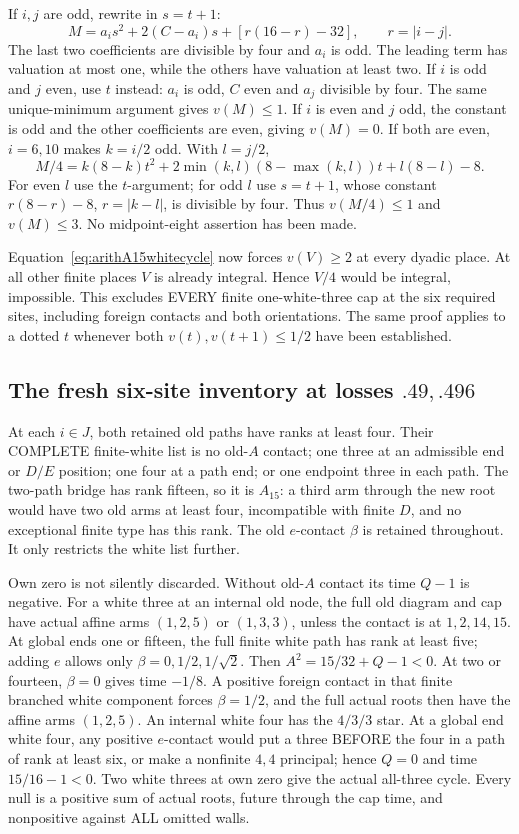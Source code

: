 \documentclass[11pt]{article}
\begin{document}
If \(i,j\) are odd, rewrite in \(s=t+1\):
\[
 M=a_is^2+2(C-a_i)s+[r(16-r)-32],\qquad r=|i-j|.
\]
The last two coefficients are divisible by four and \(a_i\)
is odd.  The leading term has valuation at most one, while
the others have valuation at least two.
If \(i\) is odd and \(j\) even, use \(t\) instead:
\(a_i\) is odd, \(C\) even and \(a_j\) divisible by four.
The same unique-minimum argument gives \(v(M)\le1\).
If \(i\) is even and \(j\) odd, the constant is odd and the
other coefficients are even, giving \(v(M)=0\).
If both are even, \(i=6,10\) makes \(k=i/2\) odd.
With \(l=j/2\),
\[
 M/4=k(8-k)t^2+2\min(k,l)(8-\max(k,l))t+l(8-l)-8 .
\]
For even \(l\) use the \(t\)-argument; for odd \(l\) use
\(s=t+1\), whose constant
\(r(8-r)-8\), \(r=|k-l|\), is divisible by four.
Thus \(v(M/4)\le1\) and \(v(M)\le3\).
No midpoint-eight assertion has been made.

Equation~\eqref{eq:arithA15whitecycle} now forces \(v(V)\ge2\)
at every dyadic place.
At all other finite places \(V\) is already integral.
Hence \(V/4\) would be integral, impossible.
This excludes EVERY finite one-white-three cap at the six
required sites, including foreign contacts and both orientations.
The same proof applies to a dotted \(t\) whenever both
\(v(t),v(t+1)\le1/2\) have been established.

\subsection{The fresh six-site inventory at losses \(.49,.496\)}
\label{app:arithA15freshinventory}

At each \(i\in J\), both retained old paths have ranks at
least four.
Their COMPLETE finite-white list is no old-\(A\) contact;
one three at an admissible end or \(D/E\) position;
one four at a path end; or one endpoint three in each path.
The two-path bridge has rank fifteen, so it is \(A_{15}\):
a third arm through the new root would have two old arms at
least four, incompatible with finite \(D\), and no exceptional
finite type has this rank.
The old \(e\)-contact \(\beta\) is retained throughout.
It only restricts the white list further.

Own zero is not silently discarded.
Without old-\(A\) contact its time \(Q-1\) is negative.
For a white three at an internal old node, the full old diagram
and cap have actual affine arms \((1,2,5)\) or \((1,3,3)\),
unless the contact is at \(1,2,14,15\).
At global ends one or fifteen, the full finite white path
has rank at least five; adding \(e\) allows only
\(\beta=0,1/2,1/\sqrt2\).
Then \(A^2=15/32+Q-1<0\).
At two or fourteen, \(\beta=0\) gives time \(-1/8\).
A positive foreign contact in that finite branched white
component forces \(\beta=1/2\), and the full actual roots
then have the affine arms \((1,2,5)\).
An internal white four has the \(4/3/3\) star.
At a global end white four, any positive \(e\)-contact would
put a three BEFORE the four in a path of rank at least six,
or make a nonfinite \(4,4\) principal; hence \(Q=0\) and
time \(15/16-1<0\).
Two white threes at own zero give the actual all-three cycle.
Every null is a positive sum of actual roots, future through
the cap time, and nonpositive against ALL omitted walls.
\end{document}
